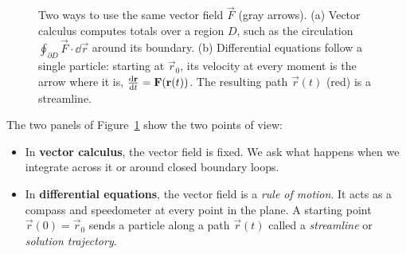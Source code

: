 \begin{figure}[htbp]
\caption{Two ways to use the same vector field $\vec F$ (gray arrows).
(a) Vector calculus computes totals over a region $D$, such as the circulation
$\oint_{\partial D} \vec F\cdot\dd\vec r$ around its boundary.
(b) Differential equations follow a single particle: starting at $\vec r_0$, its
velocity at every moment is the arrow where it is, $\frac{\mathrm{d} \mathbf{r}}{\mathrm{d} t} = \mathbf{F}(\mathbf{r}(t))$.
The resulting path $\vec r(t)$ (red) is a streamline.}
\label{ch35:fig-field-to-ode}
\end{figure}

The two panels of Figure~\ref{ch35:fig-field-to-ode} show the two points of view:
\begin{itemize}
\item In \textbf{vector calculus}, the vector field is fixed. We ask what
happens when we integrate across it or around closed boundary loops.
\item In \textbf{differential equations}, the vector field is a \emph{rule of motion}.
It acts as a compass and speedometer at every point in the plane. A starting point
$\vec r(0) = \vec r_0$ sends a particle along a path $\vec r(t)$ called a
\emph{streamline} or \emph{solution trajectory}.
\end{itemize}

